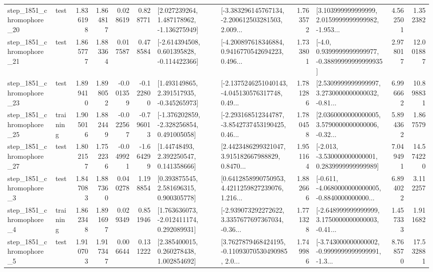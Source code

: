 \begin{tabular}{llrrrrllrlrr}
 step\_1851\_chromophore\_20 &      test &      1.836198 &    1.864817 &      0.028619 &  0.828771 &    [2.027239264, 1.487178962, -1.136275949] &  [-3.383296145767134, -2.200612503281503, 2.009... &       1.763572 &  [3.103999999999999, 2.0159999999999982, -1.953... &            4.562501 &          1.352382 \\
 step\_1851\_chromophore\_21 &      test &      1.865777 &    1.883364 &      0.017587 &  0.478584 &   [-2.614394508, 0.601395828, -0.114422366] &  [-4.200897618346884, 0.9416770542694223, 0.496... &       1.733801 &   [-4.0, 0.9399999999999977, -0.38899999999999935] &            2.978017 &         12.001887 \\
 step\_1851\_chromophore\_23 &      test &      1.899410 &    1.898052 &     -0.001359 & -0.122800 &    [1.493149865, 2.391517935, -0.345265973] &  [-2.1375246251040143, -4.045130576317748, 0.49... &       1.781286 &  [2.5309999999999997, 3.2730000000000032, -0.81... &            6.996662 &         10.898831 \\
 step\_1851\_chromophore\_25 &  training &      1.905016 &    1.882449 &     -0.022567 & -0.796013 &   [-1.376202859, -2.328256854, 0.491005058] &  [-2.293168512344787, -3.8542737453190425, 0.46... &       1.780458 &  [2.0360000000000005, 3.5790000000000006, -0.32... &            5.894362 &          1.867579 \\
 step\_1851\_chromophore\_27 &      test &      1.802157 &    1.752236 &     -0.049921 & -1.664299 &      [1.44748493, 2.392250547, 0.141358666] &  [2.4423486299321047, 3.915182667988829, 0.8470... &       1.951164 &   [-2.013, -3.530000000000001, 0.2839999999999989] &            7.049491 &         14.574220 \\
  step\_1851\_chromophore\_3 &      test &      1.847083 &    1.887360 &      0.040278 &  1.198854 &     [0.393875545, 2.581696315, 0.900305778] &  [0.6412858990750953, 4.4211259827239076, 1.216... &       1.882666 &  [-0.611, -4.0680000000000005, -0.8840000000000... &            6.894022 &          3.112257 \\
  step\_1851\_chromophore\_4 &  training &      1.862348 &    1.891697 &      0.029349 &  0.851946 &    [1.763636073, -2.012411174, 0.292089931] &  [-2.939073292272622, 3.3357677697367034, -0.36... &       1.771328 &  [-2.648999999999999, 3.1750000000000003, -0.41... &            1.457333 &          1.911682 \\
  step\_1851\_chromophore\_5 &      test &      1.910703 &    1.917347 &      0.006644 &  0.131222 &     [2.385400015, 0.260278438, 1.002854692] &  [3.7627879468424195, -0.11093070530490985, 2.0... &       1.749986 &  [-3.743000000000002, -0.9999999999999991, -1.3... &            8.768570 &         17.532881 \\

\end{tabular}
